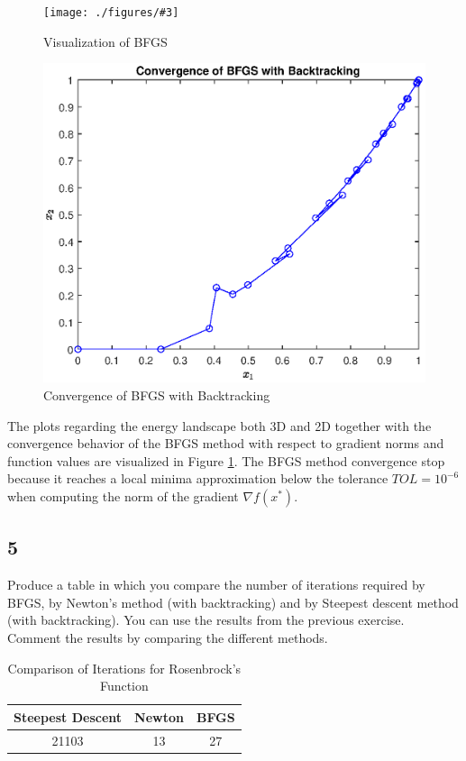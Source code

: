 \documentclass[unicode,11pt,a4paper,oneside,numbers=endperiod,openany]{scrartcl}
\newcommand{\myFigureEnergy}[3]{
    \begin{figure}[h]
    \centering
    \caption{#1}
    \label{#2}
    \texttt{[image: ./figures/\#3]}
    \end{figure}
}
\begin{document}
\myFigureEnergy
    {Visualization of BFGS}
    {fig:ex2-bfgs-energy}
    {ex2-bfgs-energy.eps}

\begin{figure}[H]
    \centering
    \caption{Convergence of BFGS with Backtracking}
    \label{fig:ex2-bfgs-convergence}
    \includegraphics[width=.6\textwidth, trim={0cm 0cm 0cm 0cm}, clip]{./figures/ex2-bfgs-convergence.eps}
\end{figure}

The plots regarding the energy landscape both 3D and 2D together with 
the convergence behavior of the BFGS method with respect to gradient norms and function values 
are visualized in Figure \ref{fig:ex2-bfgs-energy}.
The BFGS method convergence stop because it reaches a local minima approximation 
below the tolerance $TOL = 10^{-6}$ when computing the norm of the gradient $\nabla f(x^*)$.

\subsection*{5}
Produce a table in which you compare the number of iterations required by BFGS, 
by Newton's method (with backtracking) and by Steepest descent method (with backtracking). 
You can use the results from the previous exercise. 
Comment the results by comparing the different methods.

\begin{table}[h] 
    \centering
    \caption{Comparison of Iterations for Rosenbrock's Function}
    \label{tab:ex2-iterations-comparison}
    \begin{tabular}{@{}ccc@{}}
        \toprule
        Steepest Descent & Newton & BFGS \\
        \midrule
        21103 & 13  & 27 \\
        \bottomrule
    \end{tabular}
\end{table}
\end{document}
